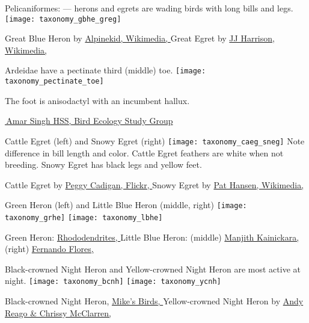 \documentclass[t]{beamer}
\begin{document}
\begin{frame}{Pelicaniformes:  —  herons and egrets are wading birds with long bills and legs.}
\vspace{-0.5\baselineskip}
\centering
\texttt{[image: taxonomy\_gbhe\_greg]}

\vfilll
\tiny Great Blue Heron by \href{https://en.wikipedia.org/wiki/File:Great_Blue_Heron_at_Sunnyvale_California.jpg}{Alpinekid, Wikimedia, } \hfill Great Egret by \href{https://en.wikipedia.org/wiki/File:Ardea_modesta.jpg}{JJ Harrison, Wikimedia, }
\end{frame}

\begin{frame}{Ardeidae have a pectinate third (middle) toe.}
\texttt{[image: taxonomy\_pectinate\_toe]}

The foot is anisodactyl with an incumbent hallux.

\tinyfill \href{https://besgroup.org/2021/09/16/cattle-egret-pectinate-claw/}{\textcopyright\,Amar Singh HSS, Bird Ecology Study Group}

\end{frame}

\begin{frame}{Cattle Egret (left) and Snowy Egret (right)}
\texttt{[image: taxonomy\_caeg\_sneg]}
Note difference in bill length and color. Cattle Egret feathers are white when not breeding. Snowy Egret has black legs and yellow feet.

\vfilll

\tiny Cattle Egret by \href{https://flickr.com/photos/peggycadigan/14158508211}{Peggy Cadigan, Flickr, } \hfill Snowy Egret by \href{https://commons.wikimedia.org/wiki/File:Snowy_Egret-1.jpg}{Pat Hansen, Wikimedia, }
\end{frame}

\begin{frame}{Green Heron (left) and Little Blue Heron (middle, right)}
\texttt{[image: taxonomy\_grhe]}\hfill 
\texttt{[image: taxonomy\_lbhe]}

\vfilll

\tiny Green Heron: \href{https://commons.wikimedia.org/wiki/File:Green_heron_in_PP_(14296).jpg}{Rhododendrites, } \hfill Little Blue Heron: (middle) \href{https://flickr.com/photos/manjithkaini/4686037391}{Manjith Kainickara, }\hfill (right) \href{https://flickr.com/photos/ferjflores/10765140464}{Fernando Flores, }
\end{frame}

\begin{frame}{Black-crowned Night Heron and Yellow-crowned Night Heron are most active at night.}
\texttt{[image: taxonomy\_bcnh]} \hfill
\texttt{[image: taxonomy\_ycnh]}

\vfilll

\tiny Black-crowned Night Heron, \href{https://flickr.com/photos/pazzani/6021109879}{Mike's Birds, } \hfill Yellow-crowned Night Heron by \href{https://flickr.com/photos/wildreturn/51220695991}{Andy Reago \& Chrissy McClarren, }
\end{frame}
\end{document}
